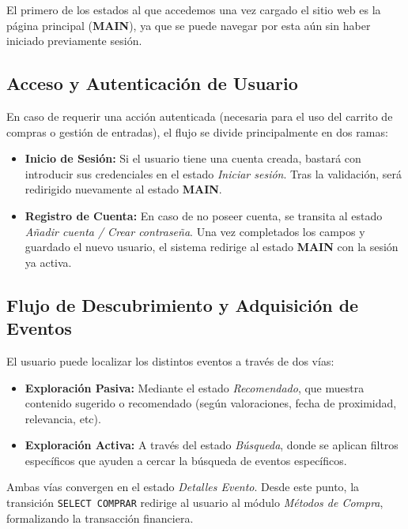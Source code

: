 \documentclass[12pt,a4paper]{article}
\begin{document}
El primero de los estados al que accedemos una vez cargado el sitio web es la página principal (\textbf{MAIN}), ya que se puede navegar por esta aún sin haber iniciado previamente sesión. 
\newpage

\subsection{Acceso y Autenticación de Usuario}

En caso de requerir una acción autenticada (necesaria para el uso del carrito de compras o gestión de entradas), el flujo se divide principalmente en dos ramas:
\begin{itemize}
    \item \textbf{Inicio de Sesión:} Si el usuario tiene una cuenta creada, bastará con introducir sus credenciales en el estado \textit{Iniciar sesión}. Tras la validación, será redirigido nuevamente al estado \textbf{MAIN}.
    \item \textbf{Registro de Cuenta:} En caso de no poseer cuenta, se transita al estado \textit{Añadir cuenta / Crear contraseña}. Una vez completados los campos y guardado el nuevo usuario, el sistema redirige al estado \textbf{MAIN} con la sesión ya activa.
\end{itemize}

\subsection{Flujo de Descubrimiento y Adquisición de Eventos}
El usuario puede localizar los distintos eventos a través de dos vías:

\begin{itemize}
    \item \textbf{Exploración Pasiva:} Mediante el estado \textit{Recomendado}, que muestra contenido sugerido o recomendado (según valoraciones, fecha de proximidad, relevancia, etc).
    \item \textbf{Exploración Activa:} A través del estado \textit{Búsqueda}, donde se aplican filtros específicos que ayuden a cercar la búsqueda de eventos específicos.
\end{itemize}
Ambas vías convergen en el estado \textit{Detalles Evento}. Desde este punto, la transición \texttt{SELECT COMPRAR} redirige al usuario al módulo \textit{Métodos de Compra}, formalizando la transacción financiera.
\end{document}
